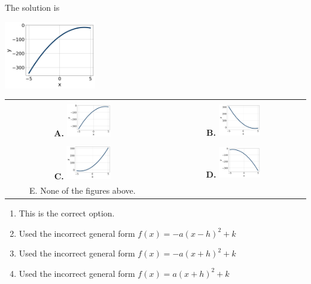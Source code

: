 \documentclass{extbook}[14pt]
\begin{document}
 
 The solution is  
 \begin{center} \includegraphics[width=0.3\textwidth]{../Figures/quadraticEquationToGraphAC.png} \end{center}\begin{tabular}{|c|c|} 
\hline 
 & \tabularnewline 
 \textbf{A.} \includegraphics[width=0.3\textwidth]{../Figures/quadraticEquationToGraphAC.png} & \textbf{B.} \includegraphics[width=0.3\textwidth]{../Figures/quadraticEquationToGraphBC.png} \tabularnewline 
\hline 
 & \tabularnewline 
 \textbf{C.} \includegraphics[width=0.3\textwidth]{../Figures/quadraticEquationToGraphCC.png} & \textbf{D.} \includegraphics[width=0.3\textwidth]{../Figures/quadraticEquationToGraphDC.png} \tabularnewline 
\hline 
 E. None of the figures above. & \tabularnewline 
\hline 
 \end{tabular} 
 
\begin{enumerate}[label=\Alph*.] 
\item This is the correct option.  
\item Used the incorrect general form $f(x) = -a(x-h)^2 + k$  
\item Used the incorrect general form $f(x) = -a(x+h)^2 + k$  
\item Used the incorrect general form $f(x) = a(x+h)^2 + k$  
\end{enumerate} 
 
\end{document}
